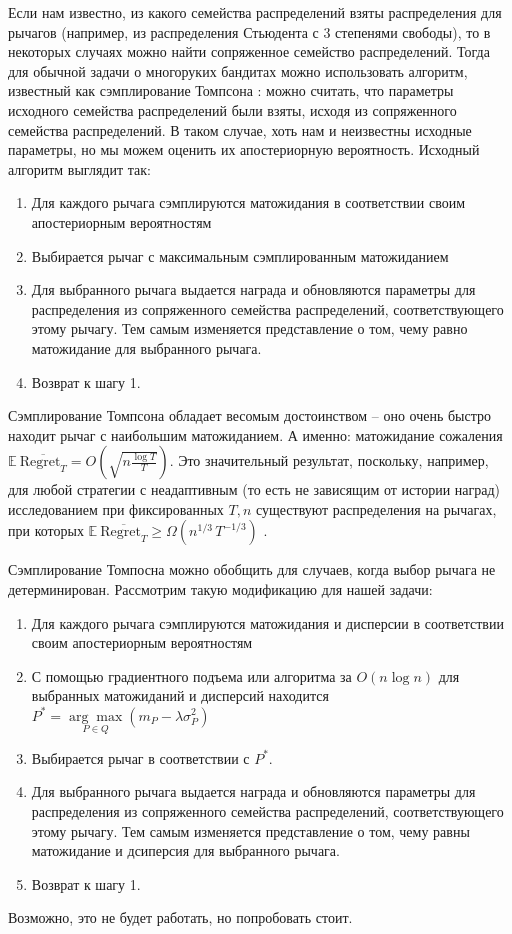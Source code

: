 Если нам известно, из какого семейства распределений взяты распределения для рычагов (например, из распределения Стьюдента с 3 степенями свободы), то в некоторых случаях можно найти сопряженное семейство распределений. Тогда для обычной задачи о многоруких бандитах можно использовать алгоритм, известный как сэмплирование Томпсона \cite{intro_bandits}: можно считать, что параметры исходного семейства распределений были взяты, исходя из сопряженного семейства распределений. В таком случае, хоть нам и неизвестны исходные параметры, но мы можем оценить их апостериорную вероятность. Исходный алгоритм выглядит так:
\begin{enumerate}
    \item Для каждого рычага сэмплируются матожидания в соответствии своим апостериорным вероятностям
    \item Выбирается рычаг с максимальным сэмплированным матожиданием
    \item Для выбранного рычага выдается награда и обновляются параметры для распределения из сопряженного семейства распределений, соответствующего этому рычагу. Тем самым изменяется представление о том, чему равно матожидание для выбранного рычага.
    \item Возврат к шагу 1.
\end{enumerate}
Сэмплирование Томпсона обладает весомым достоинством -- оно очень быстро находит рычаг с наибольшим матожиданием. А именно: матожидание сожаления $\mathbb{E} \: \overline{\text{Regret}_T} = O\left(\sqrt{n \frac{\log T}{T}} \right)$. Это значительный результат, поскольку, например, для любой стратегии с неадаптивным (то есть не зависящим от истории наград) исследованием при фиксированных $T, n$ существуют распределения на рычагах, при которых  $\mathbb{E} \: \overline{\text{Regret}_T} \geq \Omega \left(n^{1/3} \, T^{-1/3} \right)$ \cite{intro_bandits_slow_convergence}.

Сэмплирование Томпосна можно обобщить для случаев, когда выбор рычага не детерминирован. Рассмотрим такую модификацию для нашей задачи:
\begin{enumerate}
    \item Для каждого рычага сэмплируются матожидания и дисперсии в соответствии своим апостериорным вероятностям
    \item С помощью градиентного подъема или алгоритма за $O(n \log n)$ для выбранных матожиданий и дисперсий находится $P^* = \underset{P \in Q}{\arg \max} (m_P - \lambda \sigma_P^2)$
    \item Выбирается рычаг в соответствии с $P^*$.
    \item Для выбранного рычага выдается награда и обновляются параметры для распределения из сопряженного семейства распределений, соответствующего этому рычагу. Тем самым изменяется представление о том, чему равны матожидание и дсиперсия для выбранного рычага.
    \item Возврат к шагу 1.
\end{enumerate}

Возможно, это не будет работать, но попробовать стоит.
\fi